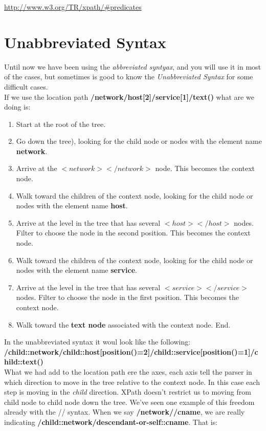 \url{http://www.w3.org/TR/xpath/#predicates}\\


\section{Unabbreviated Syntax}

Until now we have been using the \textit{abbreviated syntyax}, and you will use it in most of the cases, but sometimes is good to know the \textit{Unabbreviated Syntax} for some difficult cases.\\

If we use the location path \textbf{/network/host[2]/service[1]/text()} what are we doing is:\\

\begin{enumerate}
\item Start at the root of the tree.
\item Go down the tree), looking for the child node or nodes with the element name \textbf{network}.
\item Arrive at the $<network></network>$ node. This becomes the context node.
\item Walk toward the children of the context node, looking for the child node or nodes with the element name \textbf{host}.
\item Arrive at the level in the tree that has several $<host></host>$ nodes. Filter to choose the node in the second position. This becomes the context node.
\item Walk toward the children of the context node, looking for the child node or nodes with the element name \textbf{service}.
\item Arrive at the level in the tree that has several $<service></service>$ nodes. Filter to choose the node in the first position. This becomes the context node.
\item Walk toward the \textbf{text node} associated with the context node. End.
\end{enumerate}

In the unabbreviated syntax it woul look like the following:\\

\textbf{/child::network/child::host[position()=2]/child::service[position()=1]/child::text()}\\

What we had add to the location path ere the axes, each axis tell the parser in which direction to move in the tree relative to the context node. In this case each step is moving in the \textit{child} direction. XPath doesn’t restrict us to moving from child node to child node down the tree. We’ve seen one example of this freedom already with the // syntax. When we say \textbf{/network//cname}, we are really indicating \textbf{/child::network/descendant-or-self::cname}. That is:\\

